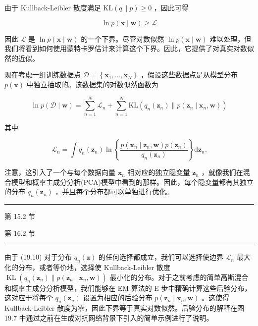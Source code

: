\documentclass[10pt]{article}
\newcommand{\HRule}{\begin{center}\rule{0.9\linewidth}{0.2mm}\end{center}}
\begin{document}
由于 Kullback-Leibler 散度满足 \(\mathrm{{KL}}\left( {q\parallel p}\right)  \geq  0\) ，因此可得

\[
\ln p\left( {\mathbf{x} \mid  \mathbf{w}}\right)  \geq  \mathcal{L} \tag{19.9}
\]

因此 \(\mathcal{L}\) 是 \(\ln p\left( {\mathbf{x} \mid  \mathbf{w}}\right)\) 的一个下界。尽管对数似然 \(\ln p\left( {\mathbf{x} \mid  \mathbf{w}}\right)\) 难以处理，但我们将看到如何使用蒙特卡罗估计来计算这个下界。因此，它提供了对真实对数似然的近似。

现在考虑一组训练数据点 \(\mathcal{D} = \left\{  {{\mathbf{x}}_{1},\ldots ,{\mathbf{x}}_{N}}\right\}\) ，假设这些数据点是从模型分布 \(p\left( \mathbf{x}\right)\) 中独立抽取的。该数据集的对数似然函数为

\[
\ln p\left( {\mathcal{D} \mid  \mathbf{w}}\right)  = \mathop{\sum }\limits_{{n = 1}}^{N}{\mathcal{L}}_{n} + \mathop{\sum }\limits_{{n = 1}}^{N}\mathrm{{KL}}\left( {{q}_{n}\left( {\mathbf{z}}_{n}\right) \parallel p\left( {{\mathbf{z}}_{n} \mid  {\mathbf{x}}_{n},\mathbf{w}}\right) }\right)  \tag{19.10}
\]

其中

\[
{\mathcal{L}}_{n} = \int {q}_{n}\left( {\mathbf{z}}_{n}\right) \ln \left\{  \frac{p\left( {{\mathbf{x}}_{n} \mid  {\mathbf{z}}_{n},\mathbf{w}}\right) p\left( {\mathbf{z}}_{n}\right) }{{q}_{n}\left( {\mathbf{z}}_{n}\right) }\right\}  \mathrm{d}{\mathbf{z}}_{n}. \tag{19.11}
\]

注意，这引入了一个与每个数据向量 \({\mathbf{x}}_{n}\) 相对应的独立隐变量 \({\mathbf{z}}_{n}\) ，就像我们在混合模型和概率主成分分析(PCA)模型中看到的那样。因此，每个隐变量都有其独立的分布 \({q}_{n}\left( {\mathbf{z}}_{n}\right)\) ，并且每个分布都可以单独进行优化。

\HRule

第 15.2 节

第 16.2 节

\HRule

由于 (19.10) 对于分布 \({q}_{n}\left( \mathbf{z}\right)\) 的任何选择都成立，我们可以选择使边界 \({\mathcal{L}}_{n}\) 最大化的分布，或者等价地，选择使 Kullback-Leibler 散度 \(\operatorname{KL}\left( {{q}_{n}\left( {\mathbf{z}}_{n}\right) \parallel p\left( {{\mathbf{z}}_{n} \mid  {\mathbf{x}}_{n},\mathbf{w}}\right) }\right)\) 最小化的分布。对于之前考虑的简单高斯混合和概率主成分分析模型，我们能够在 EM 算法的 E 步中精确计算这些后验分布，这对应于将每个 \({q}_{n}\left( {\mathbf{z}}_{n}\right)\) 设置为相应的后验分布 \(p\left( {{\mathbf{z}}_{n} \mid  {\mathbf{x}}_{n},\mathbf{w}}\right)\) 。这使得 Kullback-Leibler 散度为零，因此下界等于真实对数似然。后验分布的解释在图 19.7 中通过之前在生成对抗网络背景下引入的简单示例进行了说明。
\end{document}
